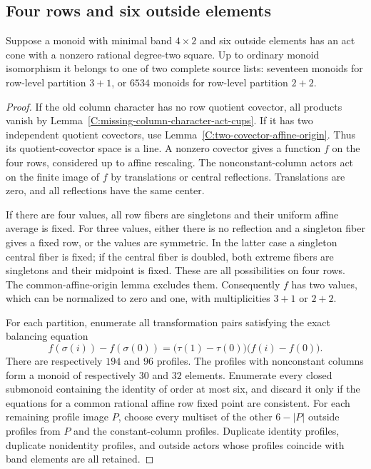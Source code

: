 \subsection{Four rows and six outside elements}

\begin{lemma}
\label{C:four-row-six-outside-source-census}
Suppose a monoid with minimal band $4\times2$ and six outside
elements has an act cone with a nonzero rational degree-two square.
Up to ordinary monoid isomorphism it belongs to one of two complete
source lists: seventeen monoids for row-level partition $3+1$, or
$6534$ monoids for row-level partition $2+2$.
\end{lemma}
\begin{proof}
If the old column character has no row quotient covector, all products
vanish by Lemma~\ref{C:missing-column-character-act-cups}.
If it has two independent quotient covectors, use
Lemma~\ref{C:two-covector-affine-origin}.
Thus its quotient-covector space is a line.  A nonzero covector gives
a function $f$ on the four rows, considered up to affine rescaling.
The nonconstant-column actors act on the finite image of $f$ by
translations or central reflections.  Translations are zero, and all
reflections have the same center.

If there are four values, all row fibers are singletons and their
uniform affine average is fixed.  For three values, either there is
no reflection and a singleton fiber gives a fixed row, or the values
are symmetric.  In the latter case a singleton central fiber is
fixed; if the central fiber is doubled, both extreme fibers are
singletons and their midpoint is fixed.  These are all possibilities
on four rows.  The common-affine-origin lemma excludes them.
Consequently $f$ has two values, which can be normalized to zero and
one, with multiplicities $3+1$ or $2+2$.

For each partition, enumerate all transformation pairs satisfying
the exact balancing equation
\[
 f(\sigma(i))-f(\sigma(0))
   =\bigl(\tau(1)-\tau(0)\bigr)\bigl(f(i)-f(0)\bigr).
\]
There are respectively $194$ and $96$ profiles.
The profiles with nonconstant columns form a monoid of respectively
$30$ and $32$ elements.  Enumerate every closed submonoid containing
the identity of order at most six, and discard it only if the
equations for a common rational affine row fixed point are consistent.
For each remaining profile image $P$, choose every multiset of the
other $6-|P|$ outside profiles from $P$ and the constant-column
profiles.  Duplicate identity profiles, duplicate nonidentity profiles,
and outside actors whose profiles coincide with band elements are
all retained.


\end{proof}
